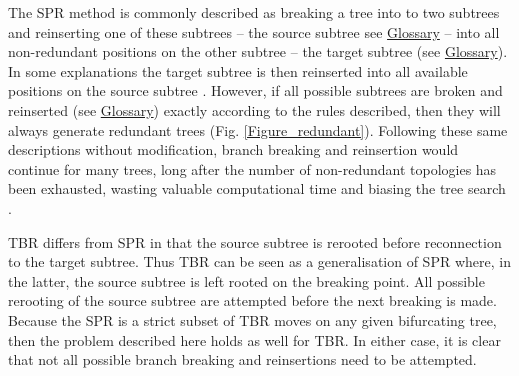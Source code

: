 \documentclass[12pt,letterpaper]{article}
\renewcommand{\section}[1]{%
\bigskip
\begin{center}
\begin{Large}
\normalfont\scshape #1
\medskip
\end{Large}
\end{center}}
\begin{document}
The SPR method is commonly described as breaking a tree into to two subtrees and reinserting one of these subtrees -- the source subtree see \hyperref[Glossary]{Glossary}%
-- into all non-redundant positions on the other subtree -- the target subtree (see \hyperref[Glossary]{Glossary}).
In some explanations the target subtree is then reinserted into all available positions on the source subtree \citep[e.g.][Fig. 8.5]{swofford2003phylogeny}.
However, if all possible subtrees are broken and reinserted (see \hyperref[Glossary]{Glossary}) %
 exactly according to the rules described, then they will always generate redundant trees (Fig. \ref{Figure_redundant}). 
Following these same descriptions without modification, branch breaking and reinsertion would continue for many trees, long after the number of non-redundant topologies has been exhausted, wasting valuable computational time and biasing the tree search \citep{goloboff2014bias}.

TBR differs from SPR in that the source subtree is rerooted before reconnection to the target subtree.
Thus TBR can be seen as a generalisation of SPR where, in the latter, the source subtree is left rooted on the breaking point.
All possible rerooting of the source subtree are attempted before the next breaking is made.
Because the SPR is a strict subset of TBR moves on any given bifurcating tree, then the problem described here holds as well for TBR.
In either case, it is clear that not all possible branch breaking and reinsertions need to be attempted.

\end{document}

